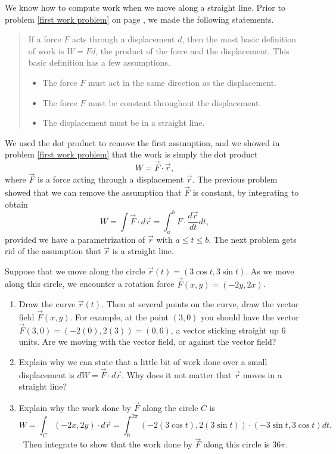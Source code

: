We know how to compute work when we move along a straight line. Prior to problem \ref{first work problem} on page \pageref{first work problem}, we made the following statements. 
\begin{quote}If a force $F$ acts through a displacement $d$, then the most basic definition of work is $W=Fd$, the product of the force and the displacement.  This basic definition has a few assumptions.
\begin{itemize}
\item The force $F$ must act in the same direction as the displacement.
\item The force $F$ must be constant throughout the  displacement.
\item The displacement must be in a straight line.
\end{itemize}
\end{quote}
We used the dot product to remove the first assumption, and we showed in problem \ref{first work problem} that the work is simply the dot product $$W=\vec F\cdot \vec r,$$
where $\vec F$ is a force acting through a displacement $\vec r$. The previous problem showed that we can remove the assumption that $\vec F$ is constant, by integrating to obtain $$W=\int \vec F \cdot d\vec r = \int_a^b F\cdot \frac{d\vec r}{dt}dt, $$ provided we have a parametrization of $\vec r$ with $a\leq t\leq b$. The next problem gets rid of the assumption that $\vec r$ is a straight line.  

\begin{problem}
%
 Suppose that we move along the circle $\vec r(t) = (3\cos t,3\sin t)$. As we move along this circle, we encounter a rotation force $\vec F(x,y) = (-2y,2x)$.
\begin{enumerate}
 \item Draw the curve $\vec r(t)$. Then at several points on the curve, draw the vector field $\vec F(x,y)$.  For example, at the point $(3,0)$ you should have the vector $\vec F(3,0)=(-2(0),2(3))=(0,6)$, a vector sticking straight up 6 units. Are we moving with the vector field, or against the vector field?
 \item Explain why we can state that a little bit of work done over a small displacement is $dW = \vec F\cdot d\vec r$. Why does it not matter that $\vec r$ moves in a straight line? 
 \item Explain why the work done by $\vec F$ along the circle $C$ is 
$$W = \int_C\left(-2x,2y\right)\cdot d\vec r
= \int_0^{2\pi}\left(-2(3\cos t),2(3\sin t)\right)\cdot(-3\sin t, 3\cos t)dt.$$\
 Then integrate to show that the work done by $\vec F$ along this circle is $36\pi$.  
\end{enumerate}
 
\end{problem}

